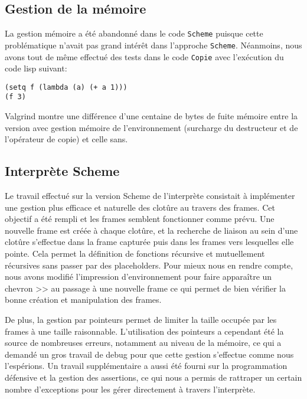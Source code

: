 \documentclass[a4paper,11pt]{article}
\begin{document}
\subsection{Gestion de la mémoire}

La gestion mémoire a été abandonné dans le code \texttt{Scheme} puisque cette 
problématique n'avait pas grand intérêt dans l'approche \texttt{Scheme}. Néanmoins,
nous avons tout de même effectué des tests dans le code \texttt{Copie} avec
l'exécution du
code lisp suivant:

\begin{lstlisting}
(setq f (lambda (a) (+ a 1)))
(f 3)
\end{lstlisting}

Valgrind montre une différence d'une centaine de bytes de fuite mémoire entre la version avec
gestion mémoire de l'environnement (surcharge du destructeur et de l'opérateur
de copie) et celle sans.

 \subsection{Interprète Scheme}

 Le travail effectué sur la version Scheme de l'interprète consistait à implémenter 
 une gestion plus efficace et naturelle des clotûre au travers des frames. Cet 
 objectif a été rempli et les frames semblent fonctionner comme prévu. Une nouvelle
 frame est créée à chaque clotûre, et la recherche de liaison au sein d'une clotûre 
 s'effectue dans la frame capturée puis dans les frames vers lesquelles elle pointe. 
 Cela permet la définition de fonctions récursive et mutuellement récursives sans 
 passer par des placeholders. Pour mieux nous en rendre compte, nous avons
 modifié l'impression d'environnement pour faire apparaître un chevron >> au
 passage à une nouvelle frame ce qui permet de bien vérifier la bonne création
 et manipulation des frames.
 
 De plus, la gestion par pointeurs permet de limiter la taille occupée par les frames 
 à une taille raisonnable. L'utilisation des pointeurs a cependant été la source de 
 nombreuses erreurs, notamment au niveau de la mémoire, ce qui a demandé un gros 
 travail de debug pour que cette gestion s'effectue comme nous l'espérions. Un travail 
 supplémentaire a aussi été fourni sur la programmation défensive et la gestion des
 assertions, ce qui nous a permis de rattraper un certain nombre d'exceptions pour les 
 gérer directement à travers l'interprète.
\end{document}
